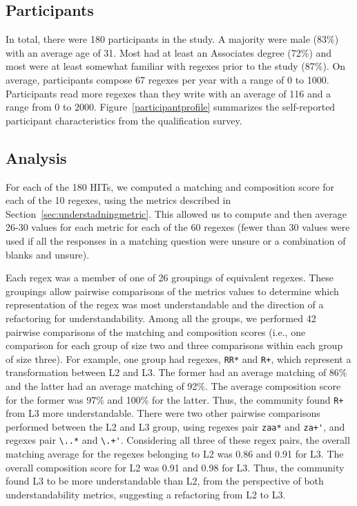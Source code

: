 \subsection{Participants}

In total, there were 180 participants in the study.
A majority were male (83\%) with an average age of 31. Most had
at least an Associates degree (72\%) and most were at least somewhat familiar with regexes prior to the study (87\%). On average,
participants compose 67 regexes per year with a range of 0 to 1000.
Participants read more regexes than they write with an average of 116 and a range from 0 to 2000.
Figure~\ref{participantprofile} summarizes the self-reported participant characteristics from the qualification survey.




\subsection{Analysis}
For each of the 180 HITs, we computed a matching and composition score for each of the 10 regexes, using the metrics described in Section~\ref{sec:understadningmetric}. This allowed us to compute and then average 26-30 values for each metric  for each of the 60 regexes (fewer than 30 values were used if all the responses in a matching question were unsure or a combination of blanks and unsure).

Each regex was a member of one of 26 groupings of equivalent regexes.
These groupings allow pairwise comparisons of the metrics values to determine which representation of the regex was most understandable and the direction of a refactoring for understandability.
Among all the groups, we performed 42 pairwise comparisons of the matching and composition scores  (i.e., one comparison for each group of size two and three comparisons within each group of size three).
For example, one group had regexes, \verb!RR*! and \verb!R+!, which  represent a transformation between L2 and L3. The former had an average matching of 86\% and the latter had an average matching of 92\%. The average composition score for the former was 97\% and 100\% for the latter. Thus, the community found \verb!R+! from L3 more understandable.
There were two other pairwise comparisons performed between the L2 and L3 group, using regexes pair \verb!zaa*! and \verb!za+'!, and regexes pair \verb!\..*! and \verb!\.+'!.
Considering all three of these regex pairs, the overall matching average for the regexes belonging to L2 was 0.86 and 0.91 for L3.
The overall composition score for L2 was 0.91 and 0.98 for L3. Thus, the community found L3 to be more understandable than L2, from the perspective of both understandability metrics, suggesting a refactoring from L2 to L3.

